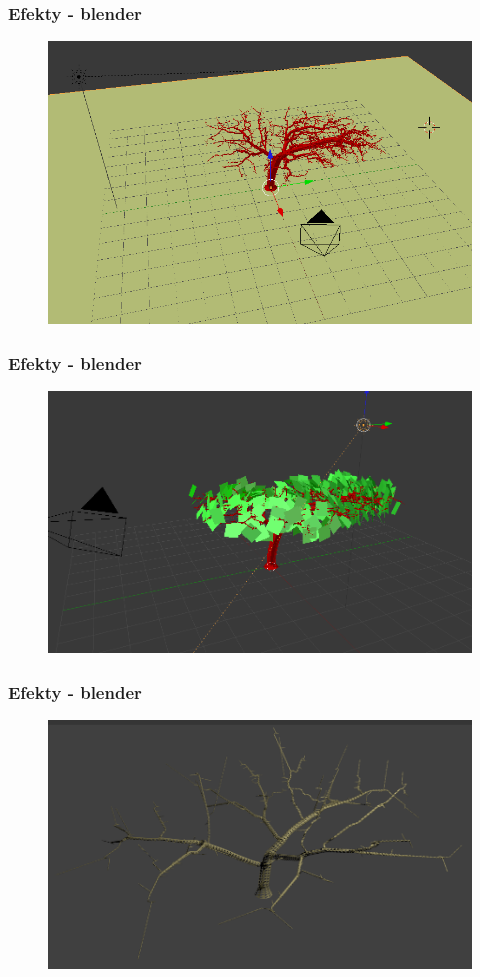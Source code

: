 \documentclass[blue,table]{beamer}
\begin{document}
\begin{frame}\frametitle{Efekty - blender}
\begin{figure}
\includegraphics[scale=0.5]{img/blender/blender0.png} 
\end{figure}
\end{frame}

\begin{frame}\frametitle{Efekty - blender}
\begin{figure}
\includegraphics[scale=0.4]{img/blender/blender1.png} 
\end{figure}
\end{frame}

\begin{frame}\frametitle{Efekty - blender}
\begin{figure}
\includegraphics[scale=0.4]{img/blender/blender2.png} 
\end{figure}
\end{frame}
\end{document}
